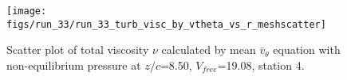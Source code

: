 \begin{figure}[H]
\centering
\texttt{[image: figs/run\_33/run\_33\_turb\_visc\_by\_vtheta\_vs\_r\_meshscatter]}
\caption{Scatter plot of total viscosity $\nu$ calculated by mean $\bar{v}_{\theta}$ equation with non-equilibrium pressure at $z/c$=8.50, $V_{free}$=19.08, station 4.}
\label{fig:run_33_turb_visc_by_vtheta_vs_r_meshscatter}
\end{figure}


